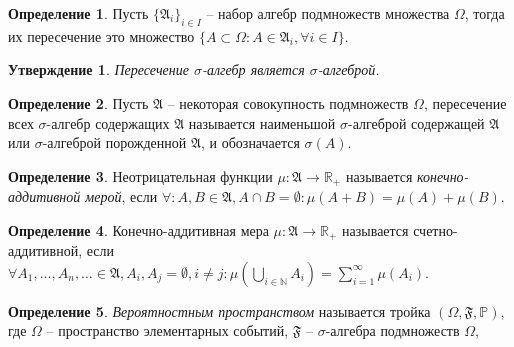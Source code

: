 \documentclass[10pt,twoside]{article}
\theoremstyle{plain}
\newtheorem{ass}{Утверждение}
\theoremstyle{definition}
\newtheorem{defi}{Определение}
\begin{document}
\begin{defi}
Пусть $\{\mathfrak{A}_i\}_{i\in I}$ -- набор алгебр подмножеств множества $\Omega$, тогда их пересечение это множество $\{A\subset \Omega:A\in\mathfrak{A}_i,\forall i\in I\}$.
\end{defi}

\begin{ass}
Пересечение $\sigma$-алгебр является $\sigma$-алгеброй.
\end{ass}

\begin{defi}
Пусть $\mathfrak{A}$ -- некоторая совокупность подмножеств $\Omega$, пересечение всех $\sigma$-алгебр содержащих $\mathfrak{A}$ называется наименьшой $\sigma$-алгеброй содержащей $\mathfrak{A}$ или $\sigma$-алгеброй порожденной $\mathfrak{A}$, и обозначается $\sigma(A)$.
\end{defi}

\begin{defi}
Неотрицательная функции $\mu:\mathfrak{A}\to\mathbb{R}_+$ называется \textit{конечно-аддитивной мерой}, если $\forall:A,B\in \mathfrak{A}, A\cap B = \emptyset:\mu(A+B)=\mu(A)+\mu(B)$.
\end{defi}

\begin{defi}
Конечно-аддитивная мера $\mu:\mathfrak{A}\to\mathbb{R}_+$ называется счетно-аддитивной, если $\forall A_1,\dots,A_n,\ldots\in\mathfrak{A},A_i,A_j=\emptyset,i\neq j:\mu\left(\bigcup\limits_{i\in\mathbb{N}}A_i\right)=\sum\limits_{i=1}^\infty\mu(A_i)$.
\end{defi}

\begin{defi}
\textit{Вероятностным пространством} называется тройка $(\Omega,\mathfrak{F},\mathbb{P})$, где $\Omega$ -- пространство элементарных событий, $\mathfrak{F}$ -- $\sigma$-алгебра подмножеств  $\Omega$, 
\end{defi}
\end{document}
